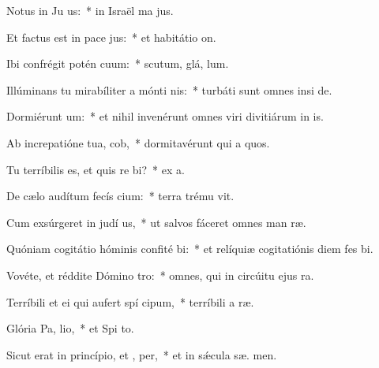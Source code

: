 \item Notus in Ju us:~* in Israël ma  jus.
\item Et factus est in pace  jus:~* et habitátio   on.
\item Ibi confrégit potén cuum:~* scutum, glá,  lum.
\item Illúminans tu mirabíliter a mónti nis:~* turbáti sunt omnes insi de.
\item Dormiérunt  um:~* et nihil invenérunt omnes viri divitiárum in  is.
\item Ab increpatióne tua,  cob,~* dormitavérunt qui a quos.
\item Tu terríbilis es, et quis re bi?~* ex   a.
\item De cælo audítum fecís cium:~* terra trému  vit.
\item Cum exsúrgeret in judí us,~* ut salvos fáceret omnes man ræ.
\item Quóniam cogitátio hóminis confité bi:~* et relíquiæ cogitatiónis diem fes  bi.
\item Vovéte, et réddite Dómino  tro:~* omnes, qui in circúitu ejus  ra.
\item Terríbili et ei qui aufert spí cipum,~* terríbili a  ræ.
\item Glória Pa,  lio,~* et Spi to.
\item Sicut erat in princípio, et ,  per,~* et in sǽcula sæ. men.
